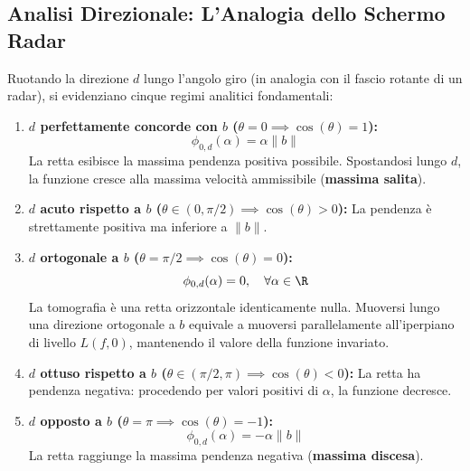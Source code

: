 \subsection{Analisi Direzionale: L'Analogia dello Schermo Radar}
Ruotando la direzione $d$ lungo l'angolo giro (in analogia con il fascio rotante di un radar), si evidenziano cinque regimi analitici fondamentali:
\begin{enumerate}
    \item \textbf{$d$ perfettamente concorde con $b$ ($\theta = 0 \implies \cos(\theta) = 1$):}
    \begin{equation}
    \phi_{0, d}(\alpha) = \alpha \|b\|
    \end{equation}
    La retta esibisce la massima pendenza positiva possibile. Spostandosi lungo $d$, la funzione cresce alla massima velocit\`a ammissibile (\textbf{massima salita}).
    
    \item \textbf{$d$ acuto rispetto a $b$ ($\theta \in (0, \pi/2) \implies \cos(\theta) > 0$):}
    La pendenza \`e strettamente positiva ma inferiore a $\|b\|$.
    
    \item \textbf{$d$ ortogonale a $b$ ($\theta = \pi/2 \implies \cos(\theta) = 0$):}
    \begin{equation}
    \phi_{0, d}(\alpha) = 0, \quad \forall \alpha \in \R
    \end{equation}
    La tomografia \`e una retta orizzontale identicamente nulla. Muoversi lungo una direzione ortogonale a $b$ equivale a muoversi parallelamente all'iperpiano di livello $L(f, 0)$, mantenendo il valore della funzione invariato.
    
    \item \textbf{$d$ ottuso rispetto a $b$ ($\theta \in (\pi/2, \pi) \implies \cos(\theta) < 0$):}
    La retta ha pendenza negativa: procedendo per valori positivi di $\alpha$, la funzione decresce.
    
    \item \textbf{$d$ opposto a $b$ ($\theta = \pi \implies \cos(\theta) = -1$):}
    \begin{equation}
    \phi_{0, d}(\alpha) = -\alpha \|b\|
    \end{equation}
    La retta raggiunge la massima pendenza negativa (\textbf{massima discesa}).
\end{enumerate}


